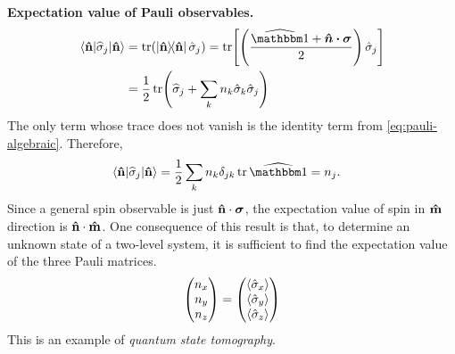 \vspace{0.5em}
\noindent 
{\bf Expectation value of Pauli observables.} 
\begin{align}
	\expval{\op\sigma_j}{\bf \hat{n}} &= \tr(\dyad{\bf \hat{n}}\hat\sigma_j) = \tr[\left(\frac{\op\id + \boldsymbol{\hat n \cdot \sigma}}{2}\right)\hat\sigma_j] \\
	&= \frac{1}{2}\tr(\op\sigma_j + \sum_k n_k \hat\sigma_k \hat\sigma_j)
\end{align}
The only term whose trace does not vanish is the identity term from \eqref{eq:pauli-algebraic}. Therefore,
\begin{align}
	\expval{\op\sigma_j}{\bf \hat{n}} &= \frac{1}{2} \sum_k n_k \delta_{jk} \tr \op\id = n_j.
\end{align}
Since a general spin observable is just ${\bf \hat{n}}\cdot \boldsymbol{\sigma}$, the expectation value of spin in $\bf \hat{m}$ direction is ${\bf \hat{n}\cdot\hat{m}}$.
One consequence of this result is that, to determine an unknown state of a two-level system, it is sufficient to find the expectation value of the three Pauli matrices.
\begin{align}
	\mqty(n_x \\ n_y \\ n_z) = \mqty(\av{\hat\sigma_x} \\ \av{\hat\sigma_y} \\ \av{\hat\sigma_z})
\end{align}
This is an example of \emph{quantum state tomography}.


